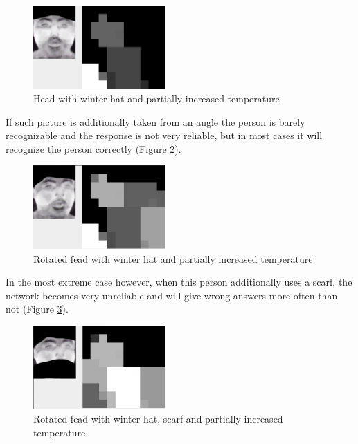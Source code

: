 \documentclass[pdftex]{article}
\begin{document}
\begin{figure}[!htb]
	\centering
	\includegraphics[width=0.45\textwidth]{pictures/heatcap.png} 
	\caption{Head with winter hat and partially increased temperature}
	\label{heatcap}
\end{figure}

 If such picture is additionally taken from an angle the person is barely recognizable and the response is not very reliable, but in most cases it will recognize the person correctly (Figure \ref{rotheatcap}).
\begin{figure}[!htb]
	\centering
	\includegraphics[width=0.45\textwidth]{pictures/rotheatcap.png} 
	\caption{Rotated fead with winter hat and partially increased temperature}
	\label{rotheatcap}
\end{figure}

\clearpage
 In the most extreme case however, when this person additionally uses a scarf, the network becomes very unreliable and will give wrong answers more often than not (Figure \ref{rotheatcapscarf}).
\begin{figure}[!htb]
	\centering
	\includegraphics[width=0.45\textwidth]{pictures/rotheatcapscarf.png} 
	\caption{Rotated fead with winter hat, scarf and partially increased temperature}
	\label{rotheatcapscarf}
\end{figure}
\end{document}
